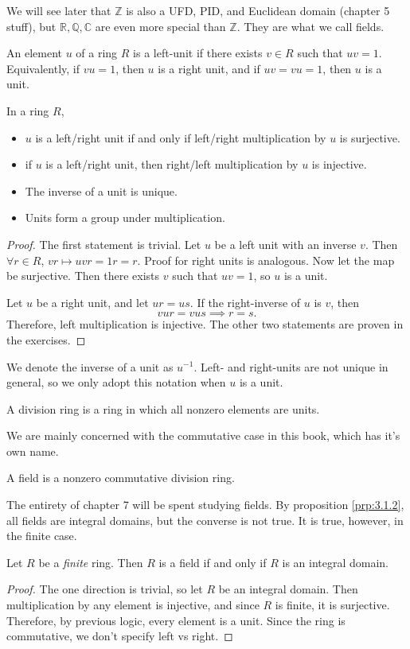 We will see later that $\mathbb{Z}$ is also a UFD, PID, and Euclidean domain (chapter 5 stuff), but $\mathbb{R},\mathbb{Q},\mathbb{C}$ are even more special than $\mathbb{Z}$. They are what we call fields.
\begin{definition}[Unit]\label{dfn:3.1.5}
	An element $u$ of a ring $R$ is a left-unit if there exists $v\in R$ such that $uv=1$. Equivalently, if $vu=1$, then $u$ is a right unit, and if $uv=vu=1$, then $u$ is a unit.
\end{definition}
\begin{proposition}\label{prp:3.1.2}
	In a ring $R$,
	\begin{itemize}
		\item $u$ is a left/right unit if and only if left/right multiplication by $u$ is surjective.
		\item if $u$ is a left/right unit, then right/left multiplication by $u$ is injective.
		\item The inverse of a unit is unique.
		\item Units form a group under multiplication.
	\end{itemize}
\end{proposition}
\begin{proof}
	The first statement is trivial. Let $u$ be a left unit with an inverse $v$. Then $\forall r\in R$, $vr \mapsto uvr=1r=r$. Proof for right units is analogous. Now let the map be surjective. Then there exists $v$ such that $uv=1$, so $u$ is a unit.

	Let $u$ be a right unit, and let $ur=us$. If the right-inverse of $u$ is $v$, then
	\[
		vur=vus \implies r=s
	.\]
	Therefore, left multiplication is injective. The other two statements are proven in the exercises.
\end{proof}
We denote the inverse of a unit as $u^{-1}$. Left- and right-units are not unique in general, so we only adopt this notation when $u$ is a unit.
\begin{definition}\label{dfn:3.1.6}
	A division ring is a ring in which all nonzero elements are units.
\end{definition}

We are mainly concerned with the commutative case in this book, which has it's own name.
\begin{definition}[Field]\label{dfn:3.1.7}
	A field is a nonzero commutative division ring.
\end{definition}
The entirety of chapter 7 will be spent studying fields. By proposition \ref{prp:3.1.2}, all fields are integral domains, but the converse is not true. It is true, however, in the finite case.
\begin{proposition}\label{prp:3.1.3}
	Let $R$ be a \emph{finite} ring. Then $R$ is a field if and only if $R$ is an integral domain.
\end{proposition}
\begin{proof}
	The one direction is trivial, so let $R$ be an integral domain. Then multiplication by any element is injective, and since $R$ is finite, it is surjective. Therefore, by previous logic, every element is a unit. Since the ring is commutative, we don't specify left vs right.
\end{proof}


